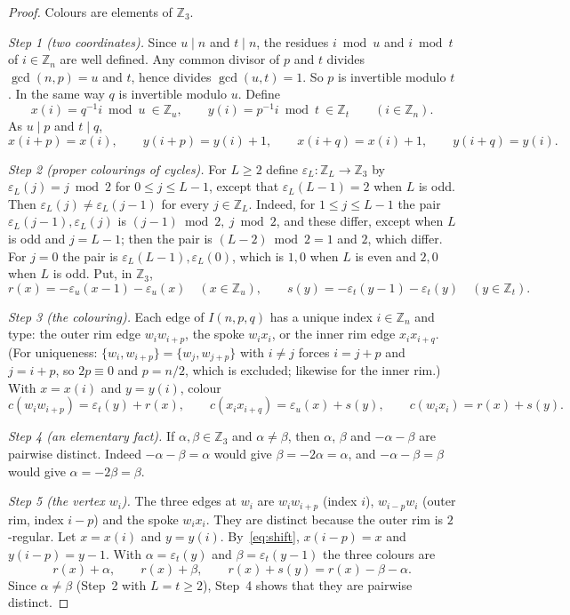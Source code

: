 \documentclass[11pt]{amsart}
\theoremstyle{plain}
\theoremstyle{definition}
\theoremstyle{remark}
\numberwithin{equation}{section}
\newcommand{\Z}{\mathbb{Z}}
\begin{document}
\begin{proof}
Colours are elements of \(\Z_3\).

\emph{Step 1 (two coordinates).} Since \(u\mid n\) and \(t\mid n\), the residues \(i\bmod u\) and \(i\bmod t\) of \(i\in\Z_n\) are well defined. Any common divisor of \(p\) and \(t\) divides \(\gcd(n,p)=u\) and \(t\), hence divides \(\gcd(u,t)=1\). So \(p\) is invertible modulo \(t\). In the same way \(q\) is invertible modulo \(u\). Define
\[
x(i)=q^{-1}i \bmod u\ \in\Z_u,\qquad y(i)=p^{-1}i \bmod t\ \in\Z_t\qquad(i\in\Z_n).
\]
As \(u\mid p\) and \(t\mid q\),
\begin{equation}\label{eq:shift}
x(i+p)=x(i),\qquad y(i+p)=y(i)+1,\qquad x(i+q)=x(i)+1,\qquad y(i+q)=y(i).
\end{equation}

\emph{Step 2 (proper colourings of cycles).} For \(L\ge2\) define \(\varepsilon_L:\Z_L\to\Z_3\) by \(\varepsilon_L(j)=j\bmod2\) for \(0\le j\le L-1\), except that \(\varepsilon_L(L-1)=2\) when \(L\) is odd. Then \(\varepsilon_L(j)\ne\varepsilon_L(j-1)\) for every \(j\in\Z_L\). Indeed, for \(1\le j\le L-1\) the pair \(\varepsilon_L(j-1),\varepsilon_L(j)\) is \((j-1)\bmod 2,\ j\bmod2\), and these differ, except when \(L\) is odd and \(j=L-1\); then the pair is \((L-2)\bmod2=1\) and \(2\), which differ. For \(j=0\) the pair is \(\varepsilon_L(L-1),\varepsilon_L(0)\), which is \(1,0\) when \(L\) is even and \(2,0\) when \(L\) is odd. Put, in \(\Z_3\),
\[
r(x)=-\varepsilon_u(x-1)-\varepsilon_u(x)\quad(x\in\Z_u),\qquad s(y)=-\varepsilon_t(y-1)-\varepsilon_t(y)\quad(y\in\Z_t).
\]

\emph{Step 3 (the colouring).} Each edge of \(I(n,p,q)\) has a unique index \(i\in\Z_n\) and type: the outer rim edge \(w_iw_{i+p}\), the spoke \(w_ix_i\), or the inner rim edge \(x_ix_{i+q}\). (For uniqueness: \(\{w_i,w_{i+p}\}=\{w_j,w_{j+p}\}\) with \(i\ne j\) forces \(i=j+p\) and \(j=i+p\), so \(2p\equiv0\) and \(p=n/2\), which is excluded; likewise for the inner rim.) With \(x=x(i)\) and \(y=y(i)\), colour
\[
c(w_iw_{i+p})=\varepsilon_t(y)+r(x),\qquad c(x_ix_{i+q})=\varepsilon_u(x)+s(y),\qquad c(w_ix_i)=r(x)+s(y).
\]

\emph{Step 4 (an elementary fact).} If \(\alpha,\beta\in\Z_3\) and \(\alpha\ne\beta\), then \(\alpha\), \(\beta\) and \(-\alpha-\beta\) are pairwise distinct. Indeed \(-\alpha-\beta=\alpha\) would give \(\beta=-2\alpha=\alpha\), and \(-\alpha-\beta=\beta\) would give \(\alpha=-2\beta=\beta\).

\emph{Step 5 (the vertex \(w_i\)).} The three edges at \(w_i\) are \(w_iw_{i+p}\) (index \(i\)), \(w_{i-p}w_i\) (outer rim, index \(i-p\)) and the spoke \(w_ix_i\). They are distinct because the outer rim is \(2\)-regular. Let \(x=x(i)\) and \(y=y(i)\). By~\eqref{eq:shift}, \(x(i-p)=x\) and \(y(i-p)=y-1\). With \(\alpha=\varepsilon_t(y)\) and \(\beta=\varepsilon_t(y-1)\) the three colours are
\[
r(x)+\alpha,\qquad r(x)+\beta,\qquad r(x)+s(y)=r(x)-\beta-\alpha .
\]
Since \(\alpha\ne\beta\) (Step~2 with \(L=t\ge2\)), Step~4 shows that they are pairwise distinct.


\end{proof}
\end{document}
